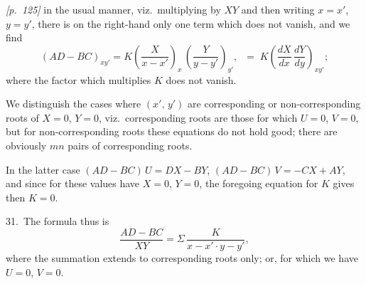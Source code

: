 \documentclass[11pt,a4paper]{article}
\theoremstyle{plain}
\theoremstyle{definition}
\theoremstyle{remark}
\begin{document}
\noindent\textit{[p.~125]} in the usual manner, viz.\ multiplying by $XY$ and then writing $x = x'$, $y = y'$, there is on the right-hand only one term which does not vanish, and we find
\[
(AD - BC)_{xy'} = K\!\left(\frac{X}{x - x'}\right)_x\,\left(\frac{Y}{y - y'}\right)_{y'}\!,\;\;=\;K\!\left(\frac{dX}{dx}\,\frac{dY}{dy}\right)_{xy'};
\]
where the factor which multiplies $K$ does not vanish.

We distinguish the cases where $(x',\,y')$ are corresponding or non-corresponding roots of $X = 0$, $Y = 0$, viz.\ corresponding roots are those for which $U = 0$, $V = 0$, but for non-corresponding roots these equations do not hold good; there are obviously $mn$ pairs of corresponding roots.

In the latter case $(AD - BC)\,U = DX - BY$, $(AD - BC)\,V = -CX + AY$, and since for these values have $X = 0$, $Y = 0$, the foregoing equation for $K$ gives then $K = 0$.

31.\ The formula thus is
\[
\frac{AD - BC}{XY} = \Sigma\,\frac{K}{x - x'\cdot y - y'},
\]
where the summation extends to corresponding roots only; or, for which we have $U = 0$, $V = 0$.

\bigskip
\end{document}
